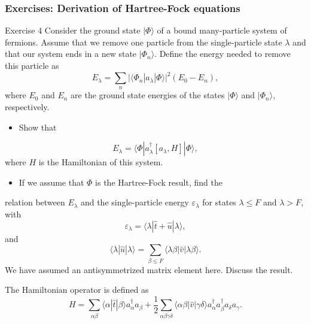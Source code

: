 \documentclass{beamer}
\begin{document}
\begin{frame}
\frametitle{Exercises: Derivation of Hartree-Fock equations}

\begin{block}{Exercise 4  }
Consider the ground state $|\Phi\rangle$ 
of a bound many-particle system of fermions. Assume that we remove one particle
from the single-particle state $\lambda$ and that our system ends in a new state
$|\Phi_{n}\rangle$. 
Define the energy needed to remove this particle as
\[
E_{\lambda}=\sum_{n}\vert\langle\Phi_{n}|a_{\lambda}|\Phi\rangle\vert^{2}(E_{0}-E_{n}),
\]
where $E_{0}$ and $E_{n}$  are the ground state energies of the states
$|\Phi\rangle$  and  $|\Phi_{n}\rangle$, respectively.
\begin{itemize}
 \item Show that
\end{itemize}

\noindent
\[
E_{\lambda}=\langle\Phi|a_{\lambda}^{\dagger}\left[
a_{\lambda},H \right]|\Phi\rangle,
\]
where $H$ is the Hamiltonian of this system.
\begin{itemize}
 \item If we assume that $\Phi$ is the  Hartree-Fock result, find the 
\end{itemize}

\noindent
relation between $E_{\lambda}$ and the single-particle energy
$\varepsilon_{\lambda}$
for states $\lambda \leq F$ and $\lambda >F$, with
\[
\varepsilon_{\lambda}=\langle\lambda|\hat{t}+\hat{u}|\lambda\rangle,
\]
and
\[
\langle\lambda|\hat{u}|\lambda\rangle=\sum_{\beta \leq F}
\langle\lambda\beta|\hat{v}|\lambda\beta\rangle.
\]
We have assumed an antisymmetrized matrix element here.
Discuss the result.

The Hamiltonian operator is defined as
\[
H=\sum_{\alpha\beta}\langle\alpha|\hat{t}|\beta\rangle a_{\alpha}^{\dagger}a_{\beta}+
\frac{1}{2}\sum_{\alpha\beta\gamma\delta}\langle\alpha\beta|\hat{v}|\gamma\delta\rangle a_{\alpha}^{\dagger}a_{\beta}^{\dagger}a_{\delta}a_{\gamma}.
\]
\end{block}
\end{frame}
\end{document}
